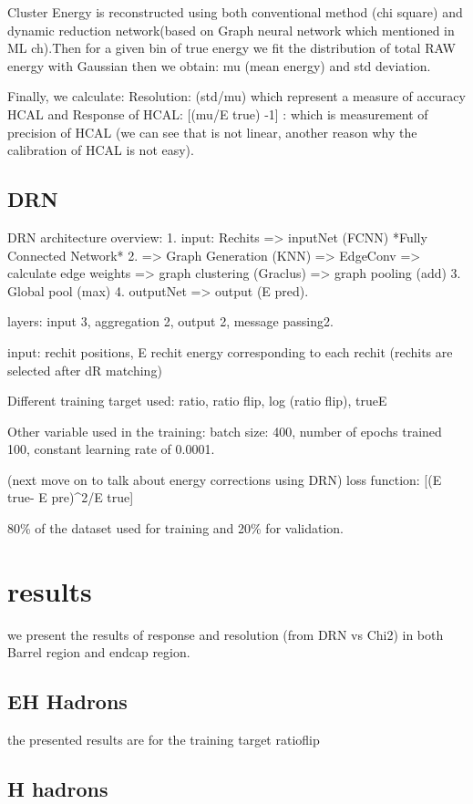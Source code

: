 
Cluster Energy is reconstructed using both conventional method (chi square) and dynamic reduction network(based on Graph neural network which mentioned in ML ch).Then for a given bin of true energy we fit the distribution of total RAW energy with Gaussian then we obtain: mu (mean energy) and std deviation.

Finally, we calculate: Resolution: (std/mu) which represent a measure of accuracy HCAL 
and Response of HCAL:  [(mu/E true) -1] : which is measurement of precision of HCAL 
(we can see that is not linear, another reason why the calibration of HCAL is not easy).

\subsection{DRN}
DRN architecture overview:
1. input: Rechits => inputNet (FCNN) *Fully Connected Network*
2. => Graph Generation (KNN) => EdgeConv => calculate edge weights => graph clustering (Graclus) => graph pooling (add)
3. Global pool (max) 4. outputNet => output (E pred).

layers: input 3, aggregation 2, output 2, message passing2.

input: rechit positions, E rechit energy corresponding to each rechit (rechits are selected after dR matching)

Different training target used: ratio, ratio flip, log (ratio flip), trueE

Other variable used in the training: batch size: 400, number of epochs trained 100, constant learning rate of 0.0001.

(next move on to talk about energy corrections using DRN) loss function:  [(E true- E pre)^2/E true]

80\% of the dataset used for training and 20\% for validation.

\section{results}
we present the results of response and resolution (from DRN vs Chi2) in  both Barrel region and endcap region.

\subsection{EH Hadrons}
the presented results are for the training target ratioflip





\subsection{H hadrons}




